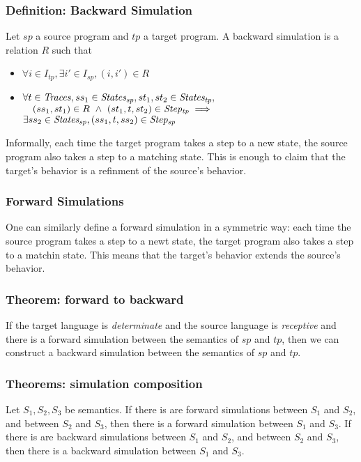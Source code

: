 \subsubsection{Definition: Backward Simulation} Let $sp$ a source program and $tp$ a target program. A backward simulation is a relation $R$ such that
\begin{itemize}
\item $\forall i\in I_{tp}, \exists i'\in I_{sp}, (i,i')\in R$
\item $\forall t\in\mathit{Traces}, ss_1\in\mathit{States_{sp}},st_1,st_2\in\mathit{States_{tp}},$\\
      $\quad(ss_1,st_1)\in R~\wedge~(st_1,t,st_2)\in\mathit{Step_{tp}}\implies$\\
      $\exists ss_2\in\mathit{States_{sp}}, (ss_1,t,ss_2)\in\mathit{Step_{sp}}$
\end{itemize}
Informally, each time the target program takes a step to a new state, the source program also takes a step to a matching state. This is enough to claim that the target's behavior is a refinment of the source's behavior.

\subsubsection{Forward Simulations} One can similarly define a forward simulation in a symmetric way: each time the source program takes a step to a newt state, the target program also takes a step to a matchin state. This means that the target's behavior extends the source's behavior.

\subsubsection{Theorem: forward to backward} If the target language is \textit{determinate} and the source language is \textit{receptive} and there is a forward simulation between the semantics of $sp$ and $tp$, then we can construct a backward simulation between the semantics of $sp$ and $tp$. 

\subsubsection{Theorems: simulation composition} Let $S_1,S_2,S_3$ be semantics.
If there is are forward simulations between $S_1$ and $S_2$, and between $S_2$ and $S_3$, then there is a forward simulation between $S_1$ and $S_3$.
If there is are backward simulations between $S_1$ and $S_2$, and between $S_2$ and $S_3$, then there is a backward simulation between $S_1$ and $S_3$.


